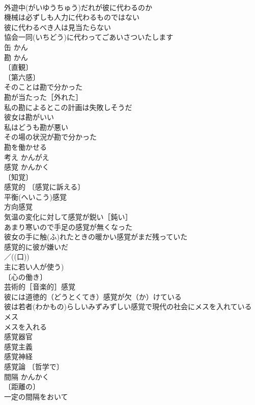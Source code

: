 \documentclass[8pt]{extreport}
\begin{document}
\begin{CJK}{UTF8}{min}
\\	外遊中(がいゆうちゅう)だれが彼に代わるのか 
\\	機械は必ずしも人力に代わるものではない 
\\	彼に代わるべき人は見当たらない 
\\	協会一同(いちどう)に代わってごあいさついたします 
\\	缶	かん	
\\	勘	かん	
\\	〔直観〕
\\	〔第六感〕
\\	そのことは勘で分かった 
\\	勘が当たった［外れた］ 
\\	私の勘によるとこの計画は失敗しそうだ 
\\	彼女は勘がいい 
\\	私はどうも勘が悪い 
\\	その場の状況が勘で分かった 
\\	勘を働かせる 
\\	考え	かんがえ	
\\	感覚	かんかく	
\\	〔知覚〕
\\	感覚的 〔感覚に訴える〕
\\	平衡(へいこう)感覚 
\\	方向感覚 
\\	気温の変化に対して感覚が鋭い［鈍い］ 
\\	あまり寒いので手足の感覚が無くなった 
\\	彼女の手に触(ふ)れたときの暖かい感覚がまだ残っていた 
\\	感覚的に彼が嫌いだ 
\\	／((口)) 
\\	主に若い人が使う) 
\\	〔心の働き〕
\\	芸術的［音楽的］感覚 
\\	彼には道徳的（どうとくてき）感覚が欠（か）けている 
\\	彼は若者(わかもの)らしいみずみずしい感覚で現代の社会にメスを入れている 
\\	メス　
\\	メスを入れる　
\\	感覚器官 
\\	感覚主義 
\\	感覚神経 
\\	感覚論 〔哲学で〕
\\	間隔	かんかく	
\\	〔距離の〕
\\	一定の間隔をおいて 

\end{CJK}
\end{document}
